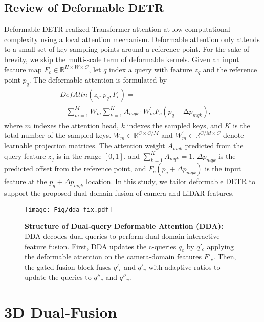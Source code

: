 \documentclass[lettersize,journal]{IEEEtran}
\begin{document}
\subsection{Review of Deformable DETR}

Deformable DETR \cite{def-detr} realized Transformer attention \cite{transformer} at low computational complexity using a local attention mechanism. 
Deformable attention only attends to a small set of key sampling points around a reference point. For the sake of brevity, we skip the multi-scale term of deformable kernels. Given an input feature map $F_{c}\in\mathbb{R}^{H{\times}W{\times}C}$, let $q$ index a query with feature $z_{q}$ and the reference point $p_{q}$. The deformable attention is formulated by
\begin{align}
   & DefAttn\left(z_q,p_q,F_{c}\right)= \nonumber \\ 
   & \;\;\; \sum_{m=1}^{M}{W_m\sum_{k=1}^{K}{A_{mqk}\cdot W_m^\prime F_{c}\left(p_q+\mathrm{\Delta}p_{mqk}\right)}},
\end{align}
where $m$ indexes the attention head, $k$ indexes the sampled keys, and $K$ is the total number of the sampled keys. $W_{m}\in\mathbb{R}^{C{\times}C/M}$ and $W^{\prime}_m\in\mathbb{R}^{C/M{\times}C}$ denote learnable projection matrices. The attention weight $A_{mqk}$ predicted from the query feature $z_q$ is in the range $[0,1]$, and $\sum_{k=1}^{K} A_{mqk}=1$. $\Delta p_{mqk}$ is the predicted offset from the reference point, and $F_{c}(p_{q}+\Delta p_{mqk})$ is the input feature at the $p_q+\Delta p_{mqk}$ location. In this study, we tailor deformable DETR to support the proposed dual-domain fusion of camera and LiDAR features.

\begin{figure*}[tbh]
	\centering
        \centerline{\texttt{[image: Fig/dda\_fix.pdf]}}
    	\caption {\textbf{Structure of Dual-query Deformable Attention  (DDA):} DDA decodes dual-queries to perform dual-domain interactive feature fusion. First, DDA updates the c-queries $q_c$ by $q'_c$ applying the deformable attention on the camera-domain features $F'_c$. Then, the gated fusion block fuses $q'_c$ and  $q'_v$ with adaptive ratios to update the queries to $q''_c$ and $q''_v$. }
	\label{dda}
\end{figure*}

\section{3D Dual-Fusion}
\end{document}
